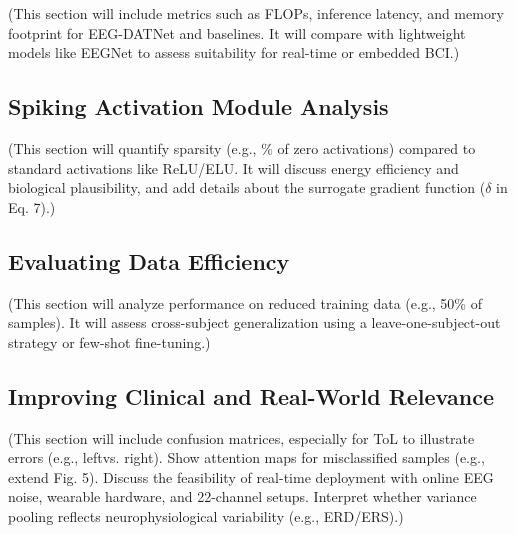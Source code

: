 \documentclass[pdflatex,sn-mathphys-num]{sn-jnl}
\theoremstyle{thmstyleone}%
\theoremstyle{thmstyletwo}%
\theoremstyle{thmstylethree}%
\begin{document}
(This section will include metrics such as FLOPs, inference latency, and memory footprint for EEG-DATNet and baselines. It will compare with lightweight models like EEGNet to assess suitability for real-time or embedded BCI.)

\subsection{Spiking Activation Module Analysis}

(This section will quantify sparsity (e.g., \% of zero activations) compared to standard activations like ReLU/ELU. It will discuss energy efficiency and biological plausibility, and add details about the surrogate gradient function ($\delta$ in Eq. 7).)

\subsection{Evaluating Data Efficiency}

(This section will analyze performance on reduced training data (e.g., 50\% of samples). It will assess cross-subject generalization using a leave-one-subject-out strategy or few-shot fine-tuning.)

\subsection{Improving Clinical and Real-World Relevance}

(This section will include confusion matrices, especially for ToL to illustrate errors (e.g., \textquotesingle left\textquotesingle vs. \textquotesingle right\textquotesingle ).
Show attention maps for misclassified samples (e.g., extend Fig. 5).
Discuss the feasibility of real-time deployment with online EEG noise, wearable hardware, and 22-channel setups.
Interpret whether variance pooling reflects neurophysiological variability (e.g., ERD/ERS).)


\end{document}
